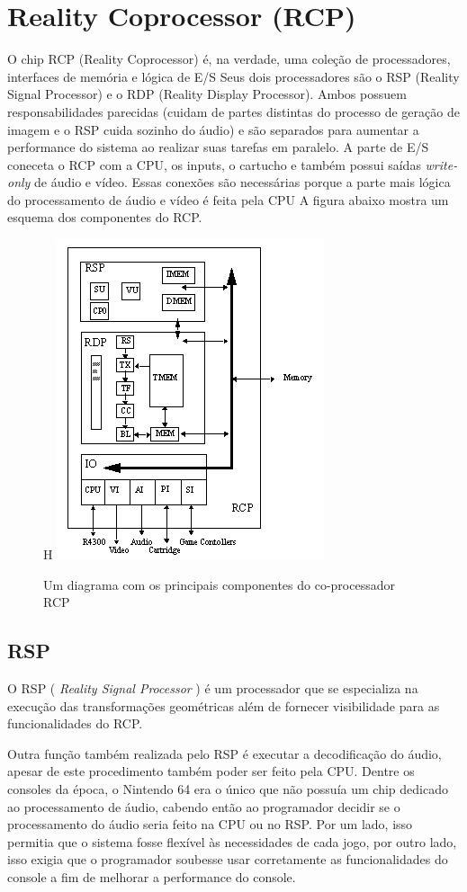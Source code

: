 \documentclass[12pt]{article}
\begin{document}
\section{Reality Coprocessor (RCP)}
O chip RCP (Reality Coprocessor) é, na verdade, uma coleção de processadores, interfaces de memória e lógica de E/S
Seus dois processadores são o RSP (Reality Signal Processor) e o RDP (Reality Display Processor). Ambos possuem responsabilidades parecidas (cuidam de partes distintas do processo de geração de imagem e o RSP cuida sozinho do áudio) e são separados para aumentar a performance do sistema ao realizar suas tarefas em paralelo.
A parte de E/S coneceta o RCP com a CPU, os inputs, o cartucho e também possui saídas \textit{write-only} de áudio e vídeo. Essas conexões são necessárias porque a parte mais lógica do processamento de áudio e vídeo é feita pela CPU
A figura abaixo mostra um esquema dos componentes do RCP.

\begin{figure}{H}
\centering
        \includegraphics[scale=.65]{figures/RCP_general}
    \caption{Um diagrama com os principais componentes do co-processador RCP}
\end{figure}

\subsection{RSP}

O RSP ( \textit{Reality Signal Processor} ) é um processador que se 
especializa na execução das transformações
geométricas além de fornecer visibilidade para as funcionalidades do RCP.

Outra função também realizada pelo RSP é executar a decodificação do áudio,
apesar de este procedimento também poder ser feito pela CPU.
Dentre os consoles da época, o Nintendo 64 era o único que não possuía um
chip dedicado ao processamento de áudio, cabendo então ao programador
decidir se o processamento do áudio seria feito na CPU ou no RSP.
Por um lado, isso permitia que o sistema fosse flexível às necessidades de
cada jogo, por outro lado, isso exigia que o programador soubesse usar
corretamente as funcionalidades do console a fim de melhorar a performance
do console.
\end{document}
